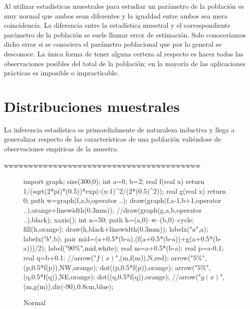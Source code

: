 \documentclass[a4paper]{report}
\begin{document}
															Al utilizar estadísticas muestrales para estudiar un parámetro
															de la población es muy normal que ambos sean diferentes y la
															igualdad entre ambos sea mera coincidencia. La diferencia
															entre la estadística muestral y el correspondiente parámetro
															de la población se suele llamar error de estimación. Solo
															conoceríamos dicho error si se conociera el parámetro
															poblacional que por lo general se desconoce. La única forma
															de tener alguna certeza al respecto es hacer todas las
															observaciones posibles del total de la población; en la mayoría
															de las aplicaciones prácticas es imposible o impracticable.


															\chapter{Distribuciones muestrales}
															La inferencia estadística es primordialmente de naturaleza
															inductiva y llega a generalizar respecto de las características de
															una población valiéndose de observaciones empíricas de la
															muestra.

															wwwwwwwwwwwwwwwwwwwwwwwwwwwwwwwwwwwwwwww


															\begin{figure}[!ht]
																\centering
																\begin{asy}
																	import graph;
																	size(300,0);
																	int a=0, b=2;
																	real f(real x) {return 1/(sqrt(2*pi)*(0.5))*exp(-(x-1)^2/(2*(0.5)^2));}
																	real g(real x) {return 0;}
																	path w=graph(f,a,b,operator ..);
																	draw(graph(f,a-1,b+1,operator ..),orange+linewidth(0.3mm));
																	//draw(graph(g,a,b,operator ..),black);
																	xaxis();
																	int n=50;
																	path h=(a,0)--w--(b,0)--cycle;
																	fill(h,orange);
																	draw(h,black+linewidth(0.3mm));
																	labelx("$a$",a);
																	labelx("$b$",b);
																	pair mid=(a+0.5*(b-a),(f(a+0.5*(b-a))+g(a+0.5*(b-a)))/2);
																	label("$90\%$",mid,white);
																	real m=a+0.5*(b-a);
																	real p=a-0.1;
																	real q=b+0.1;
																	//arrow("$f(x)$",(m,f(m)),N,red);
																	arrow("$5\%$",(p,0.5*f(p)),NW,orange);
																	dot((p,0.5*f(p)),orange);
																	arrow("$5\%$",(q,0.5*f(q)),NE,orange);
																	dot((q,0.5*f(q)),orange);
																	//arrow("$g(x)$",(m,g(m)),dir(-90),0.8cm,blue);
																\end{asy}
																\caption{Normal}
															\end{figure}
\end{document}
